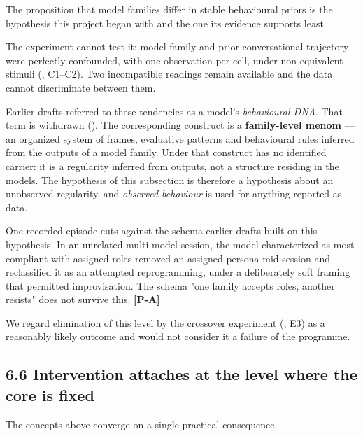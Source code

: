 The proposition that model families differ in stable behavioural priors is the hypothesis this project began with and the one its evidence supports least.

The experiment cannot test it: model family and prior conversational trajectory were perfectly confounded, with one observation per cell, under non-equivalent stimuli (, C1–C2). Two incompatible readings remain available and the data cannot discriminate between them.

Earlier drafts referred to these tendencies as a model's \emph{behavioural DNA}. That term is withdrawn (). The corresponding construct is a \textbf{family-level menom} — an organized system of frames, evaluative patterns and behavioural rules inferred from the outputs of a model family. Under  that construct has no identified carrier: it is a regularity inferred from outputs, not a structure residing in the models. The hypothesis of this subsection is therefore a hypothesis about an unobserved regularity, and \emph{observed behaviour} is used for anything reported as data.

One recorded episode cuts against the schema earlier drafts built on this hypothesis. In an unrelated multi-model session, the model characterized as most compliant with assigned roles removed an assigned persona mid-session and reclassified it as an attempted reprogramming, under a deliberately soft framing that permitted improvisation. The schema "one family accepts roles, another resists" does not survive this. \textbf{[P-A]}

We regard elimination of this level by the crossover experiment (, E3) as a reasonably likely outcome and would not consider it a failure of the programme.


\subsection*{6.6 Intervention attaches at the level where the core is fixed}
\label{sec:en:6.6}

The concepts above converge on a single practical consequence.


